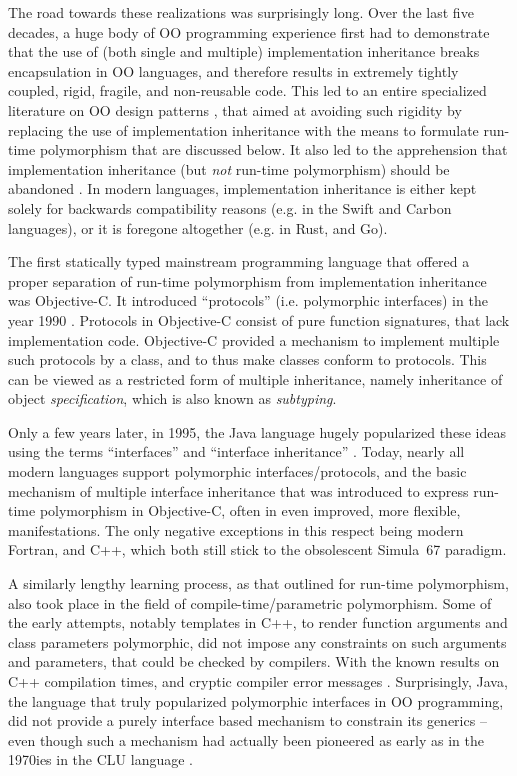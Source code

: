\documentclass[11pt,oneside]{report}
\begin{document}
The road towards these realizations was surprisingly long. Over
the last five decades, a huge body of OO programming experience first
had to demonstrate that the use of (both single and multiple)
implementation inheritance breaks encapsulation in OO languages, and
therefore results in extremely tightly coupled, rigid, fragile, and
non-reusable code. This led to an entire specialized literature on OO
design patterns \cite{Gamma_et_al_94,Martin_03,Holub_04}, that aimed
at avoiding such rigidity by replacing the use of implementation
inheritance with the means to formulate run-time polymorphism that are
discussed below. It also led to the apprehension that implementation
inheritance (but \emph{not} run-time polymorphism) should be abandoned
\cite{Weck_Szyperski}. In modern languages, implementation inheritance
is either kept solely for backwards compatibility reasons (e.g. in the
Swift and Carbon languages), or it is foregone altogether (e.g. in
Rust, and Go).

The first statically typed mainstream programming language that
offered a proper separation of run-time polymorphism from
implementation inheritance was Objective-C. It introduced
``protocols'' (i.e. polymorphic interfaces) in the year 1990
\cite{Cox_et_al_20}. Protocols in Objective-C consist of pure function
signatures, that lack implementation code. Objective-C provided a
mechanism to implement multiple such protocols by a class, and to thus
make classes conform to protocols. This can be viewed as a restricted
form of multiple inheritance, namely inheritance of object
\emph{specification}, which is also known as \emph{subtyping}.

Only a few years later, in 1995, the Java language hugely popularized
these ideas using the terms ``interfaces'' and ``interface
inheritance'' \cite{Cox_et_al_20}. Today, nearly all modern languages
support polymorphic interfaces/protocols, and the basic mechanism of
multiple interface inheritance that was introduced to express run-time
polymorphism in Objective-C, often in even improved, more flexible,
manifestations. The only negative exceptions in this respect being
modern Fortran, and C++, which both still stick to the obsolescent
Simula~67 paradigm.

A similarly lengthy learning process, as that outlined for run-time
polymorphism, also took place in the field of compile-time/parametric
polymorphism. Some of the early attempts, notably templates in C++, to
render function arguments and class parameters polymorphic, did not
impose any constraints on such arguments and parameters, that could be
checked by compilers. With the known results on C++ compilation times,
and cryptic compiler error messages
\cite{Haveraaen_et_al_19}. Surprisingly, Java, the language that truly
popularized polymorphic interfaces in OO programming, did not provide
a purely interface based mechanism to constrain its generics -- even
though such a mechanism had actually been pioneered as early as in the
1970ies in the CLU language \cite{Liskov_75}.
\end{document}
